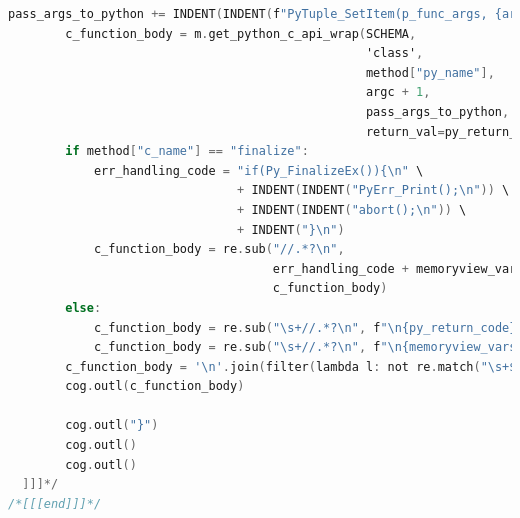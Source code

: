 \begin{lstlisting}[language={C},basicstyle=\tiny,stepnumber=1,caption={Шаблон устройства},label={lst:core.template.c}]
        pass_args_to_python += INDENT(INDENT(f"PyTuple_SetItem(p_func_args, {argc}, DictWithClassFields);\n"))
        c_function_body = m.get_python_c_api_wrap(SCHEMA,
                                                  'class',
                                                  method["py_name"],
                                                  argc + 1,
                                                  pass_args_to_python,
                                                  return_val=py_return_val_name)
        if method["c_name"] == "finalize":
            err_handling_code = "if(Py_FinalizeEx()){\n" \
                                + INDENT(INDENT("PyErr_Print();\n")) \
                                + INDENT(INDENT("abort();\n")) \
                                + INDENT("}\n")
            c_function_body = re.sub("//.*?\n",
                                     err_handling_code + memoryview_vars_free + '\n',
                                     c_function_body)
        else:
            c_function_body = re.sub("\s+//.*?\n", f"\n{py_return_code}\n{memoryview_vars_free}\n", c_function_body, count=1)
            c_function_body = re.sub("\s+//.*?\n", f"\n{memoryview_vars_free}\n", c_function_body, count=1)
        c_function_body = '\n'.join(filter(lambda l: not re.match("\s+$", l), c_function_body.splitlines()))
        cog.outl(c_function_body)

        cog.outl("}")
        cog.outl()
        cog.outl()
  ]]]*/
/*[[[end]]]*/
\end{lstlisting}


